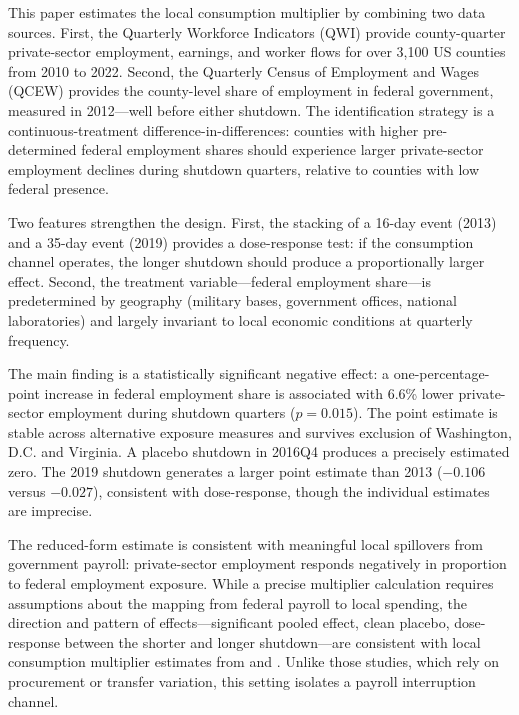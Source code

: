 \documentclass[12pt]{article}
\begin{document}
This paper estimates the local consumption multiplier by combining two data sources. First, the Quarterly Workforce Indicators (QWI) provide county-quarter private-sector employment, earnings, and worker flows for over 3,100 US counties from 2010 to 2022. Second, the Quarterly Census of Employment and Wages (QCEW) provides the county-level share of employment in federal government, measured in 2012---well before either shutdown. The identification strategy is a continuous-treatment difference-in-differences: counties with higher pre-determined federal employment shares should experience larger private-sector employment declines during shutdown quarters, relative to counties with low federal presence.

Two features strengthen the design. First, the stacking of a 16-day event (2013) and a 35-day event (2019) provides a dose-response test: if the consumption channel operates, the longer shutdown should produce a proportionally larger effect. Second, the treatment variable---federal employment share---is predetermined by geography (military bases, government offices, national laboratories) and largely invariant to local economic conditions at quarterly frequency.

The main finding is a statistically significant negative effect: a one-percentage-point increase in federal employment share is associated with 6.6\% lower private-sector employment during shutdown quarters ($p = 0.015$). The point estimate is stable across alternative exposure measures and survives exclusion of Washington, D.C. and Virginia. A placebo shutdown in 2016Q4 produces a precisely estimated zero. The 2019 shutdown generates a larger point estimate than 2013 ($-0.106$ versus $-0.027$), consistent with dose-response, though the individual estimates are imprecise.

The reduced-form estimate is consistent with meaningful local spillovers from government payroll: private-sector employment responds negatively in proportion to federal employment exposure. While a precise multiplier calculation requires assumptions about the mapping from federal payroll to local spending, the direction and pattern of effects---significant pooled effect, clean placebo, dose-response between the shorter and longer shutdown---are consistent with local consumption multiplier estimates from \citet{chodorow2019geographic} and \citet{suarez2016benefits}. Unlike those studies, which rely on procurement or transfer variation, this setting isolates a payroll interruption channel.
\end{document}
